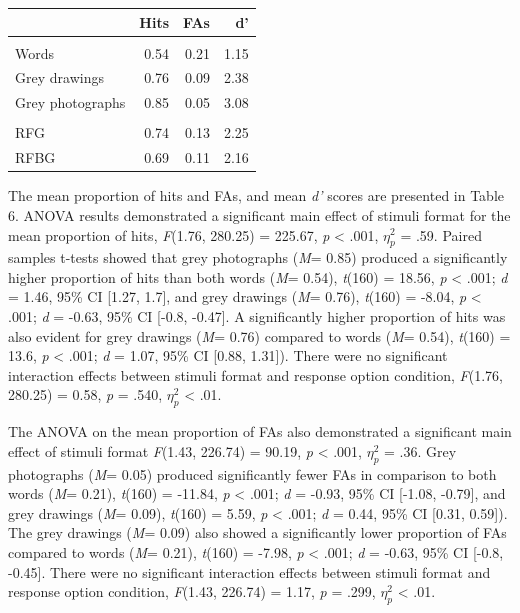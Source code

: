 \documentclass[
  11pt,
]{article}
\begin{document}
\begin{table}[!h]
\centering
\begin{tabular}{>{\raggedright\arraybackslash}p{4cm}rrr}
\toprule
  & Hits & FAs & d'\\
\midrule
\addlinespace[0.3em]
\multicolumn{4}{l}{\textbf{Stimuli format}}\\
\hspace{1em}Words & 0.54 & 0.21 & 1.15\\
\hspace{1em}Grey drawings & 0.76 & 0.09 & 2.38\\
\hspace{1em}Grey photographs & 0.85 & 0.05 & 3.08\\
\addlinespace[0.3em]
\multicolumn{4}{l}{\textbf{Response option}}\\
\hspace{1em}RFG & 0.74 & 0.13 & 2.25\\
\hspace{1em}RFBG & 0.69 & 0.11 & 2.16\\
\bottomrule
\end{tabular}
\end{table}

The mean proportion of hits and FAs, and mean \emph{d'} scores are
presented in Table 6. ANOVA results demonstrated a significant main
effect of stimuli format for the mean proportion of hits, \emph{F}(1.76,
280.25) = 225.67, \emph{p} \textless{} .001, \(\eta^2_p\) = .59. Paired
samples t-tests showed that grey photographs (\emph{M}= 0.85) produced a
significantly higher proportion of hits than both words (\emph{M}=
0.54), \emph{t}(160) = 18.56, \emph{p} \textless{} .001; \emph{d} =
1.46, 95\% CI {[}1.27, 1.7{]}, and grey drawings (\emph{M}= 0.76),
\emph{t}(160) = -8.04, \emph{p} \textless{} .001; \emph{d} = -0.63, 95\%
CI {[}-0.8, -0.47{]}. A significantly higher proportion of hits was also
evident for grey drawings (\emph{M}= 0.76) compared to words (\emph{M}=
0.54), \emph{t}(160) = 13.6, \emph{p} \textless{} .001; \emph{d} = 1.07,
95\% CI {[}0.88, 1.31{]}). There were no significant interaction effects
between stimuli format and response option condition, \emph{F}(1.76,
280.25) = 0.58, \emph{p} = .540, \(\eta^2_p\) \textless{} .01.

The ANOVA on the mean proportion of FAs also demonstrated a significant
main effect of stimuli format \emph{F}(1.43, 226.74) = 90.19, \emph{p}
\textless{} .001, \(\eta^2_p\) = .36. Grey photographs (\emph{M}= 0.05)
produced significantly fewer FAs in comparison to both words (\emph{M}=
0.21), \emph{t}(160) = -11.84, \emph{p} \textless{} .001; \emph{d} =
-0.93, 95\% CI {[}-1.08, -0.79{]}, and grey drawings (\emph{M}= 0.09),
\emph{t}(160) = 5.59, \emph{p} \textless{} .001; \emph{d} = 0.44, 95\%
CI {[}0.31, 0.59{]}). The grey drawings (\emph{M}= 0.09) also showed a
significantly lower proportion of FAs compared to words (\emph{M}=
0.21), \emph{t}(160) = -7.98, \emph{p} \textless{} .001; \emph{d} =
-0.63, 95\% CI {[}-0.8, -0.45{]}. There were no significant interaction
effects between stimuli format and response option condition,
\emph{F}(1.43, 226.74) = 1.17, \emph{p} = .299, \(\eta^2_p\) \textless{}
.01.
\end{document}
